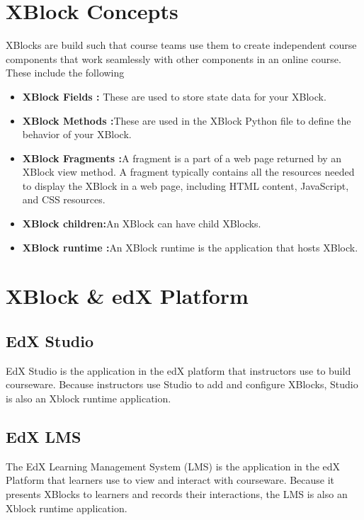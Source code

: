 \section{XBlock Concepts}
XBlocks are build such that course teams use them to create independent course components that
work seamlessly with other components in an online course. These include the following\newline
\begin{itemize}
	\item \textbf{XBlock Fields : }\newline These are used to store state data for your XBlock.
	\item \textbf{XBlock Methods :}\newline These are used in the XBlock Python file to define the behavior of your XBlock.
	\item \textbf{XBlock Fragments :}\newline A fragment is a part of a web page returned by an XBlock view
method. A fragment typically contains all the resources needed to display the XBlock in a
web page, including HTML content, JavaScript, and CSS resources.
	\item \textbf{XBlock children:}\newline An XBlock can have child XBlocks.
	\item \textbf{XBlock runtime :}\newline An XBlock runtime is the application that hosts XBlock.
\end{itemize}

\section{XBlock \& edX Platform}

\subsection{EdX Studio}
EdX Studio is the application in the edX platform that instructors use to build courseware. Because
instructors use Studio to add and configure XBlocks, Studio is also an Xblock runtime application.

\subsection{EdX LMS}
The EdX Learning Management System (LMS) is the application in the edX Platform that learners
use to view and interact with courseware. Because it presents XBlocks to learners and records their
interactions, the LMS is also an Xblock runtime application.

